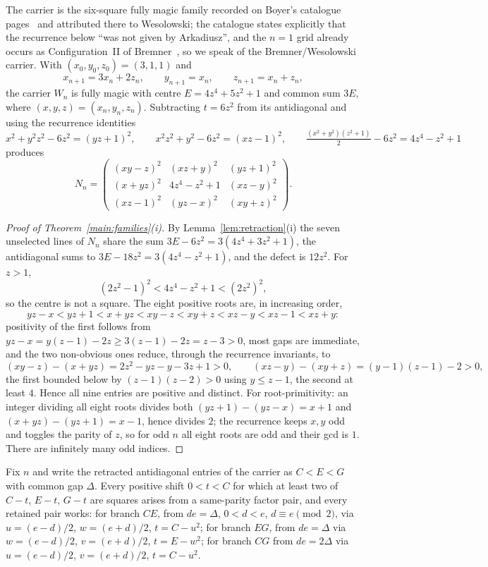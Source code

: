 The carrier is the six-square fully magic family recorded on Boyer's
catalogue pages~\cite{BOYWEB} and attributed there to Wesolowski; the
catalogue states explicitly that the recurrence below ``was not given by
Arkadiusz'', and the $n=1$ grid already occurs as Configuration~II of
Bremner~\cite{BRE01}, so we speak of the Bremner/Wesolowski carrier. With
$(x_0,y_0,z_0)=(3,1,1)$ and
\[
x_{n+1}=3x_n+2z_n,\qquad y_{n+1}=x_n,\qquad z_{n+1}=x_n+z_n,
\]
the carrier $W_n$ is fully magic with centre $E=4z^4+5z^2+1$ and common sum
$3E$, where $(x,y,z)=(x_n,y_n,z_n)$. Subtracting $t=6z^2$ from its
antidiagonal and using the recurrence identities
\[
x^2+y^2z^2-6z^2=(yz+1)^2,\qquad
x^2z^2+y^2-6z^2=(xz-1)^2,\qquad
\tfrac{(x^2+y^2)(z^2+1)}{2}-6z^2=4z^4-z^2+1
\]
produces
\[
N_n=\begin{pmatrix}
(xy-z)^2 & (xz+y)^2 & (yz+1)^2\\
(x+yz)^2 & 4z^4-z^2+1 & (xz-y)^2\\
(xz-1)^2 & (yz-x)^2 & (xy+z)^2
\end{pmatrix}.
\]

\begin{proof}[Proof of Theorem~\ref{main:families}(i)]
By Lemma~\ref{lem:retraction}(i) the seven unselected lines of $N_n$ share
the sum $3E-6z^2=3(4z^4+3z^2+1)$, the antidiagonal sums to
$3E-18z^2=3(4z^4-z^2+1)$, and the defect is $12z^2$. For $z>1$,
\[
(2z^2-1)^2<4z^4-z^2+1<(2z^2)^2,
\]
so the centre is not a square. The eight positive roots are, in increasing
order,
\[
yz-x<yz+1<x+yz<xy-z<xy+z<xz-y<xz-1<xz+y:
\]
positivity of the first follows from $yz-x=y(z-1)-2z\ge3(z-1)-2z=z-3>0$,
most gaps are immediate, and the two non-obvious ones reduce, through the
recurrence invariants, to
\[
(xy-z)-(x+yz)=2z^2-yz-y-3z+1>0,\qquad
(xz-y)-(xy+z)=(y-1)(z-1)-2>0,
\]
the first bounded below by $(z-1)(z-2)>0$ using $y\le z-1$, the second at
least $4$. Hence all nine entries are positive and distinct. For
root-primitivity: an integer dividing all eight roots divides both
$(yz+1)-(yz-x)=x+1$ and $(x+yz)-(yz+1)=x-1$, hence divides $2$; the
recurrence keeps $x,y$ odd and toggles the parity of $z$, so for odd $n$
all eight roots are odd and their gcd is $1$. There are infinitely many
odd indices.
\end{proof}

\begin{proposition}\label{prop:factorpairs}
Fix $n$ and write the retracted antidiagonal entries of the carrier as
$C<E<G$ with common gap $\Delta$. Every positive shift $0<t<C$ for which at
least two of $C-t$, $E-t$, $G-t$ are squares arises from a same-parity
factor pair, and every retained pair works: for branch $CE$, from
$de=\Delta$, $0<d<e$, $d\equiv e\pmod2$, via $u=(e-d)/2$, $w=(e+d)/2$,
$t=C-u^2$; for branch $EG$, from $de=\Delta$ via $w=(e-d)/2$,
$v=(e+d)/2$, $t=E-w^2$; for branch $CG$ from $de=2\Delta$
via $u=(e-d)/2$, $v=(e+d)/2$, $t=C-u^2$.
\end{proposition}


